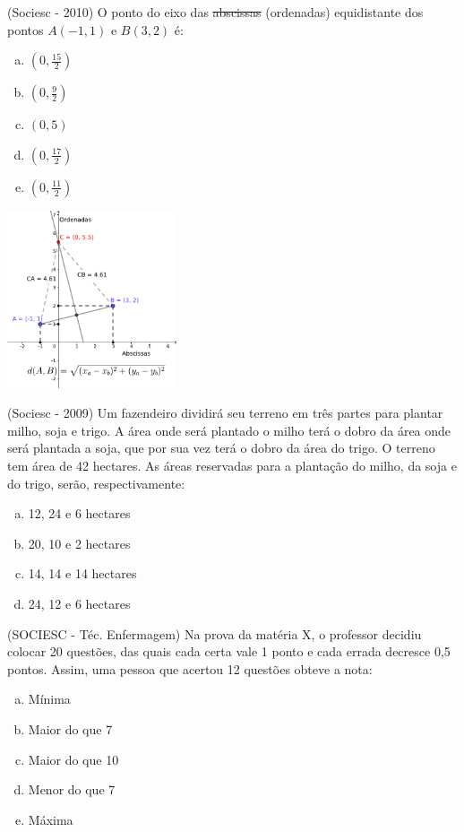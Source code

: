  \begin{exer}
 (Sociesc - 2010) O ponto do eixo das \sout{abscissas} (ordenadas) equidistante dos pontos $A(-1, 1)$ e $B(3, 2)$ é:

 \begin{multicols}{2}
 \begin{enumerate}[a)]
  \item $(0, \frac{15}{2})$
  \item $(0, \frac{9}{2})$
  \item $(0,5)$
  \item $(0, \frac{17}{2})$
  \item $(0, \frac{11}{2})$
 \end{enumerate}

 \includegraphics[width=5cm]{./cap_equacoes/figs/dist_exer1}

 \end{multicols}
 \end{exer}

 \begin{exer}
 (Sociesc - 2009) Um fazendeiro dividirá seu terreno em três partes para plantar milho, soja e trigo. A área onde será plantado o milho terá o dobro da área onde será plantada a soja, que por sua vez terá o dobro da área do trigo. O terreno tem área de 42 hectares. As áreas reservadas para a plantação do milho, da soja e do trigo, serão, respectivamente:
  \begin{enumerate}[a)]
  \item 12, 24 e 6 hectares
  \item 20, 10 e 2 hectares
  \item 14, 14 e 14 hectares
  \item 24, 12 e 6 hectares
 \end{enumerate}
 \end{exer}

 \begin{exer}
  (SOCIESC - Téc. Enfermagem) Na prova da matéria X, o professor decidiu colocar 20 questões, das quais cada certa vale 1 ponto e cada errada decresce 0,5 pontos. Assim, uma pessoa que acertou 12 questões obteve a nota:
  \begin{enumerate}[a)]
  \item Mínima
  \item Maior do que 7
  \item Maior do que 10
  \item Menor do que 7
  \item Máxima
 \end{enumerate}
 \end{exer}

